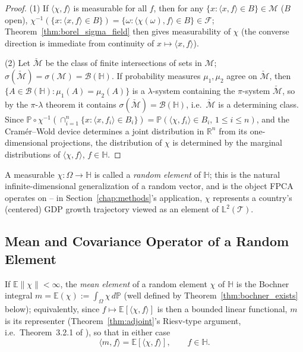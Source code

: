 \begin{proof}
(1) If $\langle\chi,f\rangle$ is measurable for all $f$, then for any
$\{x:\langle x,f\rangle\in B\}\in\mathcal{M}$ ($B$ open), $\chi^{-1}
(\{x:\langle x,f\rangle\in B\}) = \{\omega:\langle\chi(\omega),f\rangle\in
B\}\in\mathcal{F}$; Theorem~\ref{thm:borel_sigma_field} then gives
measurability of $\chi$ (the converse direction is immediate from
continuity of $x\mapsto\langle x,f\rangle$).

(2) Let $\check{\mathcal{M}}$ be the class of finite intersections of sets
in $\mathcal{M}$; $\sigma(\check{\mathcal{M}}) = \sigma(\mathcal{M}) =
\mathcal{B}(\mathbb{H})$. If probability measures $\mu_1,\mu_2$ agree on
$\check{\mathcal{M}}$, then $\{A\in\mathcal{B}(\mathbb{H}):\mu_1(A)=
\mu_2(A)\}$ is a $\lambda$-system containing the $\pi$-system
$\check{\mathcal{M}}$, so by the $\pi$-$\lambda$ theorem it contains
$\sigma(\check{\mathcal{M}})=\mathcal{B}(\mathbb{H})$, i.e.\
$\check{\mathcal{M}}$ is a determining class. Since $\mathbb{P}\circ
\chi^{-1}(\cap_{i=1}^n\{x:\langle x,f_i\rangle\in B_i\}) = \mathbb{P}
(\langle\chi,f_i\rangle\in B_i,\,1\leq i\leq n)$, and the Cram\'er--Wold
device determines a joint distribution in $\mathbb{R}^n$ from its
one-dimensional projections, the distribution of $\chi$ is determined by
the marginal distributions of $\langle\chi,f\rangle$, $f\in\mathbb{H}$.
\end{proof}

A measurable $\chi:\Omega\to\mathbb{H}$ is called a \emph{random element}
of $\mathbb{H}$; this is the natural infinite-dimensional generalization of
a random vector, and is the object FPCA operates on -- in
Section~\ref{chap:methods}'s application, $\chi$ represents a country's
(centered) GDP growth trajectory viewed as an element of $\mathbb{L}^2
(\mathcal{T})$.

\subsection{Mean and Covariance Operator of a Random Element}
\label{subsec:mean_cov_operator}

\begin{definition}
\label{def:mean_element}
If $\mathbb{E}\|\chi\|<\infty$, the \emph{mean element} of a random
element $\chi$ of $\mathbb{H}$ is the Bochner integral $m=\mathbb{E}(\chi)
:=\int_\Omega\chi\,d\mathbb{P}$ (well defined by
Theorem~\ref{thm:bochner_exists} below); equivalently, since
$f\mapsto\mathbb{E}[\langle\chi,f\rangle]$ is then a bounded linear
functional, $m$ is its representer (Theorem~\ref{thm:adjoint}'s
Riesv-type argument, i.e.\ Theorem~3.2.1 of \cite{hsingeubank2015}), so
that in either case
\begin{equation}
\langle m,f\rangle = \mathbb{E}[\langle\chi,f\rangle], \qquad f\in
\mathbb{H}.
\label{eq:mean_element_char}
\end{equation}
\end{definition}

